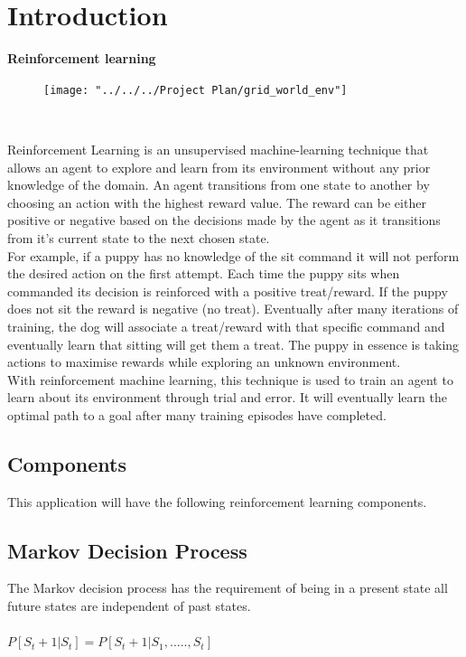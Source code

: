 \chapter{Introduction}
\textbf{Reinforcement learning}\\
\begin{figure}[H]
	\centering
	\texttt{[image: "../../../Project Plan/grid\_world\_env"]}
	\caption{}
	\label{fig:gridworldenv}
	~\cite{GridWorl45:online}
\end{figure}
Reinforcement Learning is an unsupervised machine-learning technique that allows an agent to explore and learn from its environment without any prior knowledge of the domain. 
An agent transitions from one state to another by choosing an action with the highest reward value. The reward can be either positive or negative based on the decisions made by the agent as it transitions from it's current state to the next chosen state.\\
For example, if a puppy has no knowledge of the sit command it will not perform the desired action on the first attempt. Each time the puppy sits when commanded its decision is reinforced with a positive treat/reward. If the puppy does not sit the reward is negative (no treat). Eventually after many iterations of training, the dog will associate a treat/reward with that specific command and eventually learn that sitting will get them a treat. 
The puppy in essence is taking actions to maximise rewards while exploring an unknown environment.\\
With reinforcement machine learning, this technique is used to train an agent to learn about its environment through trial and error. It will eventually learn the optimal path to a goal after many training episodes have completed.

\section{Components}
This application will have the following reinforcement learning components.

\section{Markov Decision Process}
The Markov decision process has the requirement of being in a present state all future states are independent of past states.\\\\
$P[S_{t}+1 | S_{t}] = P[S_{t}+1 | S_{1}, ..... , S_{t}]$\\\\

